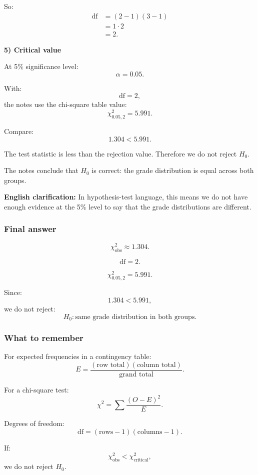 \documentclass[10pt]{article}
\begin{document}
So:
\begin{align*}
\text{df}
&=
(2-1)(3-1)
\\[2mm]
&=
1\cdot 2
\\[2mm]
&=2.
\end{align*}

\textbf{5) Critical value}

At 5\% significance level:
\[
\alpha=0.05.
\]

With:
\[
\text{df}=2,
\]
the notes use the chi-square table value:
\[
\chi^2_{0.05,2}=5.991.
\]

Compare:
\[
1.304<5.991.
\]

The test statistic is less than the rejection value.
Therefore we do not reject \(H_0\).

The notes conclude that \(H_0\) is correct:
the grade distribution is equal across both groups.

\textbf{English clarification:}
In hypothesis-test language, this means we do not
have enough evidence at the 5\% level to say that
the grade distributions are different.

\subsubsection*{Final answer}

\[
\chi^2_{\text{obs}}\approx 1.304.
\]

\[
\text{df}=2.
\]

\[
\chi^2_{0.05,2}=5.991.
\]

Since:
\[
1.304<5.991,
\]
we do not reject:
\[
H_0:
\text{same grade distribution in both groups.}
\]

\subsubsection*{What to remember}

For expected frequencies in a contingency table:
\[
E=
\frac{
(\text{row total})(\text{column total})
}{
\text{grand total}
}.
\]

For a chi-square test:
\[
\chi^2
=
\sum
\frac{(O-E)^2}{E}.
\]

Degrees of freedom:
\[
\text{df}
=
(\text{rows}-1)(\text{columns}-1).
\]

If:
\[
\chi^2_{\text{obs}}
<
\chi^2_{\text{critical}},
\]
we do not reject \(H_0\).
\end{document}
